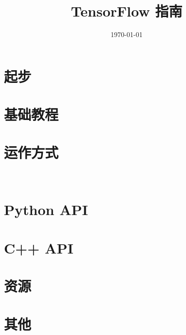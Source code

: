 \documentclass[a4paper,11pt,twoside]{ctexbook}
\title{TensorFlow 指南}
\author{}
\date{\today}
\begin{document}
\maketitle
\tableofcontents

\newpage
\chapter{起步}




\newpage
\chapter{基础教程}













\newpage
\chapter{运作方式}











🍁💕🍁💕🍁💕🍁💕🍁💕🍁💕🍁💕🍁💕🍁💕 %

\newpage
\chapter{Python API}















\newpage
\chapter{C++ API}

\newpage
\chapter{资源}

\newpage
\chapter{其他}
\end{document}
